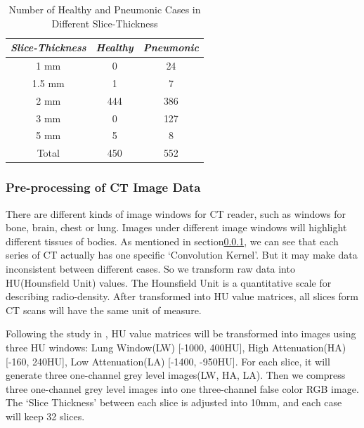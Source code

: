\documentclass[journal]{IEEEtran}
\begin{document}
\begin{table}[htb]
\vspace{-0cm}
\caption{Number of Healthy and Pneumonic Cases in Different Slice-Thickness}
\vspace{-0cm}
\begin{center}
\begin{tabular}{|c|c|c|}
\hline
\textbf{\textit{Slice-Thickness}}& \textbf{\textit{Healthy}}& \textbf{\textit{Pneumonic}}  \\
\hline
1 mm & 0 & 24 \\
1.5 mm  & 1 & 7\\
2 mm & 444 & 386  \\
3 mm & 0 & 127  \\
5 mm & 5 & 8  \\
\hline
Total & 450 & 552 \\
\hline
\end{tabular}
\vspace{-0cm}
\label{distributionofhealthyandpneumonic}
\end{center}
\vspace{-0cm}
\end{table}

\subsubsection{Pre-processing of CT Image Data}
\label{ctimagedata}
There are different kinds of image windows for CT reader, such as windows for bone, brain, chest or lung. Images under different image windows will highlight different tissues of bodies.
As mentioned in section\ref{ctimagedata}, we can see that each series of CT actually has one specific `Convolution Kernel'. But it may make data inconsistent between different cases. So we transform raw data into HU(Hounsfield Unit) values. The Hounsfield Unit is a quantitative scale for describing radio-density. After transformed into HU value matrices, all slices form CT scans will have the same unit of measure.

Following the study in \cite{Shin2017Three} \cite{gao2018holistic}, HU value matrices will be transformed into images using three HU windows: Lung Window(LW) [-1000, 400HU], High Attenuation(HA) [-160, 240HU], Low Attenuation(LA) [-1400, -950HU]. 
For each slice, it will generate three one-channel grey level images(LW, HA, LA). Then we compress three one-channel grey level images into one three-channel false color RGB image. The `Slice Thickness' between each slice is adjusted into 10mm, and each case will keep 32 slices.
\end{document}
